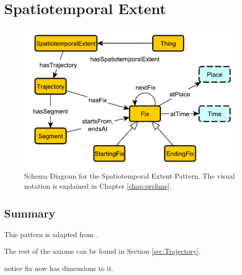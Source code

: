 \section{Spatiotemporal Extent}
\label{sec:Spatiotemporal}
\begin{figure}[h!]
\begin{center}
\includegraphics[width=.8\textwidth]{figures/ste}
\end{center}
\caption{Schema Diagram for the Spatiotemporal Extent Pattern. The visual notation is explained in Chapter \ref{chap:prelims}.}
\label{fig:Spatiotemporal}
\end{figure}
\subsection{Summary}
\label{sum:Spatiotemporal}
This pattern is adapted from \cite{ste}.

The rest of the axioms can be found in Section \ref{sec:Trajectory}.

notice fix now has dimensions to it.

